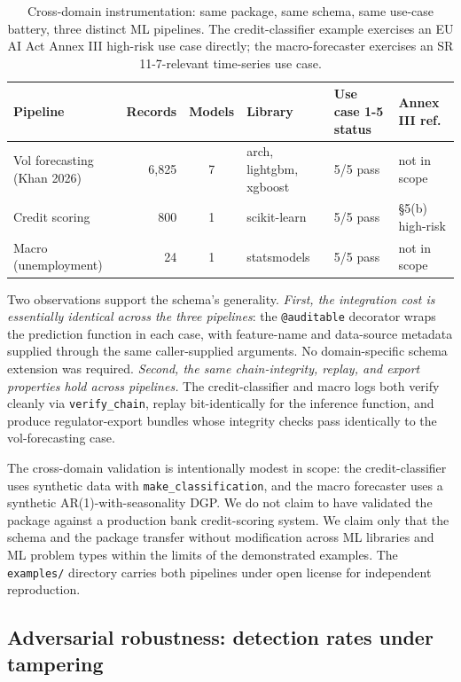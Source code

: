 \begin{table}[H]
\centering
\caption{Cross-domain instrumentation: same package, same schema, same use-case battery, three distinct ML pipelines. The credit-classifier example exercises an EU AI Act Annex III high-risk use case directly; the macro-forecaster exercises an SR 11-7-relevant time-series use case.}\label{tab:crossdomain}
\footnotesize
\setlength{\tabcolsep}{4pt}
\begin{tabular}{@{}p{3.4cm}rcp{3.0cm}ll@{}}
\toprule
Pipeline & Records & Models & Library & Use case 1-5 status & Annex III ref. \\
\midrule
Vol forecasting (Khan 2026) & 6{,}825 & 7 & arch, lightgbm, xgboost & 5/5 pass & not in scope \\
Credit scoring & 800 & 1 & scikit-learn & 5/5 pass & §5(b) high-risk \\
Macro (unemployment) & 24 & 1 & statsmodels & 5/5 pass & not in scope \\
\bottomrule
\end{tabular}
\end{table}

Two observations support the schema's generality. \emph{First, the integration cost is essentially identical across the three pipelines}: the \texttt{@auditable} decorator wraps the prediction function in each case, with feature-name and data-source metadata supplied through the same caller-supplied arguments. No domain-specific schema extension was required. \emph{Second, the same chain-integrity, replay, and export properties hold across pipelines.} The credit-classifier and macro logs both verify cleanly via \texttt{verify\_chain}, replay bit-identically for the inference function, and produce regulator-export bundles whose integrity checks pass identically to the vol-forecasting case.

The cross-domain validation is intentionally modest in scope: the credit-classifier uses synthetic data with \texttt{make\_classification}, and the macro forecaster uses a synthetic AR(1)-with-seasonality DGP. We do not claim to have validated the package against a production bank credit-scoring system. We claim only that the schema and the package transfer without modification across ML libraries and ML problem types within the limits of the demonstrated examples. The \texttt{examples/} directory carries both pipelines under open license for independent reproduction.

\subsection{Adversarial robustness: detection rates under tampering}\label{sec:demonstration_adversarial}

